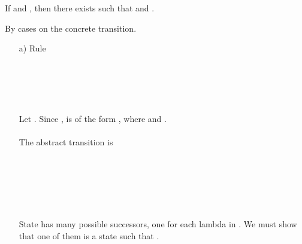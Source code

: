 \documentclass{LMCS}
\theoremstyle{definition} \newtheorem{property}[thm]{Property}
\begin{document}
\begin{thm}[Simulation]
If  and , then 
there exists  such that 
and .
\end{thm}
\proof
By cases on the concrete transition. 
\begin{enumerate}[]
  \item[a)]
    Rule  \\
     \\
     \\
     \\
     \\ 
    \\
    Let .
    Since , \astat{} is of the form 
    , where 
    and . \\
    \\
    The abstract transition is \\
     \\
     \\
     \\
     \\
     \\
    \\
    State \astat{} has many possible successors, one for each lambda in 
    .
    We must show that one of them is a state  such that 
    .


\end{enumerate}
\end{document}
